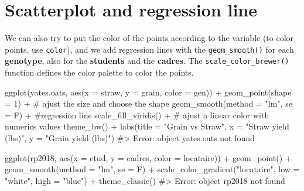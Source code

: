 \documentclass[
  letterpaper,
  DIV=11,
  numbers=noendperiod]{scrreprt}
\newenvironment{Shaded}{\begin{snugshade}}{\end{snugshade}}
\newcommand{\AttributeTok}[1]{\textcolor[rgb]{0.40,0.45,0.13}{#1}}
\newcommand{\CommentTok}[1]{\textcolor[rgb]{0.37,0.37,0.37}{#1}}
\newcommand{\DecValTok}[1]{\textcolor[rgb]{0.68,0.00,0.00}{#1}}
\newcommand{\FunctionTok}[1]{\textcolor[rgb]{0.28,0.35,0.67}{#1}}
\newcommand{\NormalTok}[1]{\textcolor[rgb]{0.00,0.23,0.31}{#1}}
\newcommand{\SpecialCharTok}[1]{\textcolor[rgb]{0.37,0.37,0.37}{#1}}
\newcommand{\StringTok}[1]{\textcolor[rgb]{0.13,0.47,0.30}{#1}}
\begin{document}
\section{Scatterplot and regression
line}\label{scatterplot-and-regression-line}

We can also try to put the color of the points according to the variable
(to color points, use \texttt{color}), and we add regression lines with
the \texttt{geom\_smooth()} for each \textbf{genotype}, also for the
\textbf{students} and the \textbf{cadres}. The
\texttt{scale\_color\_brewer()} function defines the color palette to
color the points.

\begin{Shaded}
\begin{Highlighting}[]
\FunctionTok{ggplot}\NormalTok{(yates.oats, }\FunctionTok{aes}\NormalTok{(}\AttributeTok{x =}\NormalTok{ straw, }\AttributeTok{y =}\NormalTok{ grain, }\AttributeTok{color =}\NormalTok{ gen)) }\SpecialCharTok{+}
    \FunctionTok{geom\_point}\NormalTok{(}\AttributeTok{shape =} \DecValTok{1}\NormalTok{) }\SpecialCharTok{+} \CommentTok{\# ajust the size and choose the shape}
    \FunctionTok{geom\_smooth}\NormalTok{(}\AttributeTok{method =} \StringTok{"lm"}\NormalTok{, }\AttributeTok{se =}\NormalTok{ F) }\SpecialCharTok{+} \CommentTok{\#regression line}
    \FunctionTok{scale\_fill\_viridis}\NormalTok{() }\SpecialCharTok{+} \CommentTok{\# ajust a linear color with numerics values}
    \FunctionTok{theme\_bw}\NormalTok{() }\SpecialCharTok{+}
    \FunctionTok{labs}\NormalTok{(}\AttributeTok{title =} \StringTok{"Grain vs Straw"}\NormalTok{, }\AttributeTok{x =} \StringTok{"Straw yield (lbs)"}\NormalTok{, }\AttributeTok{y =} \StringTok{"Grain yield (lbs)"}\NormalTok{)}
\CommentTok{\#\textgreater{} Error: object \textquotesingle{}yates.oats\textquotesingle{} not found}


\FunctionTok{ggplot}\NormalTok{(rp2018, }\FunctionTok{aes}\NormalTok{(}\AttributeTok{x =}\NormalTok{ etud, }\AttributeTok{y =}\NormalTok{ cadres, }\AttributeTok{color =}\NormalTok{ locataire)) }\SpecialCharTok{+} 
  \FunctionTok{geom\_point}\NormalTok{() }\SpecialCharTok{+} 
  \FunctionTok{geom\_smooth}\NormalTok{(}\AttributeTok{method =} \StringTok{"lm"}\NormalTok{, }\AttributeTok{se =}\NormalTok{ F) }\SpecialCharTok{+}
  \FunctionTok{scale\_color\_gradient}\NormalTok{(}\StringTok{"locataire"}\NormalTok{, }\AttributeTok{low =} \StringTok{"white"}\NormalTok{, }\AttributeTok{high =} \StringTok{"blue"}\NormalTok{) }\SpecialCharTok{+}
  \FunctionTok{theme\_classic}\NormalTok{()}
\CommentTok{\#\textgreater{} Error: object \textquotesingle{}rp2018\textquotesingle{} not found}
\end{Highlighting}
\end{Shaded}
\end{document}
